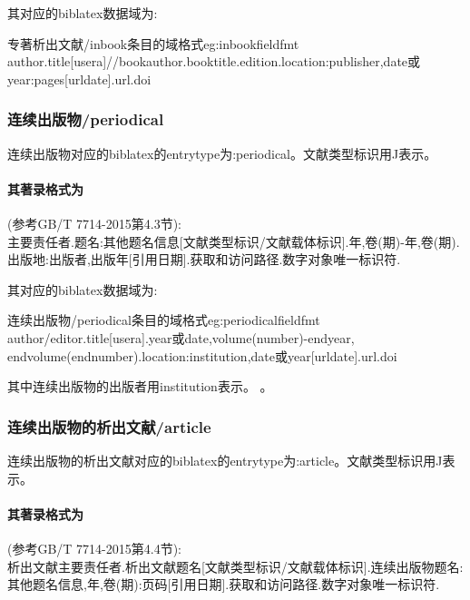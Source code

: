 其对应的biblatex数据域为:
\begin{codetex}{专著析出文献/inbook条目的域格式}{eg:inbookfieldfmt}
author.title[usera]//bookauthor.booktitle.edition.location:publisher,date或year:pages[urldate].url.doi
\end{codetex}

\subsubsection{连续出版物/periodical}
\begin{refentry}{}{}
连续出版物对应的biblatex的entrytype为:periodical。文献类型标识用J表示。

\paragraph{其著录格式为}(参考GB/T 7714-2015第4.3节):\\
主要责任者.题名:其他题名信息[文献类型标识/文献载体标识].年,卷(期)-年,卷(期).出版地:出版者,出版年[引用日期].获取和访问路径.数字对象唯一标识符.
\end{refentry}

其对应的biblatex数据域为:
\begin{codetex}{连续出版物/periodical条目的域格式}{eg:periodicalfieldfmt}
author/editor.title[usera].year或date,volume(number)-endyear, endvolume(endnumber).location:institution,date或year[urldate].url.doi
\end{codetex}

其中连续出版物的出版者用institution表示。
。

\subsubsection{连续出版物的析出文献/article}
\begin{refentry}{}{}%
连续出版物的析出文献对应的biblatex的entrytype为:article。文献类型标识用J表示。

\paragraph{其著录格式为}(参考GB/T 7714-2015第4.4节):\\
析出文献主要责任者.析出文献题名[文献类型标识/文献载体标识].连续出版物题名:其他题名信息,年,卷(期):页码[引用日期].获取和访问路径.数字对象唯一标识符.
\end{refentry}

